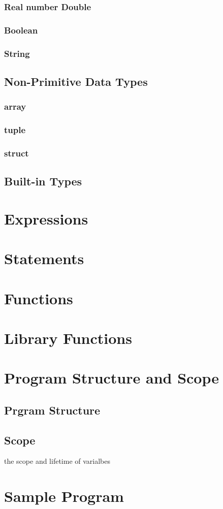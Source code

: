 \documentclass[12pt]{article}
\begin{document}
\subsubsection{Real number Double}
\subsubsection{Boolean}
\subsubsection{String}


\subsection{Non-Primitive Data Types}
\subsubsection{array}
\subsubsection{tuple}
\subsubsection{struct}

\subsection{Built-in Types}

\section{Expressions}
\section{Statements}
\section{Functions}
\section{Library Functions}
\section{Program Structure and Scope}

\subsection{Prgram Structure}

\subsection{Scope}
the scope and lifetime of varialbes\\

\section{Sample Program}
\end{document}
